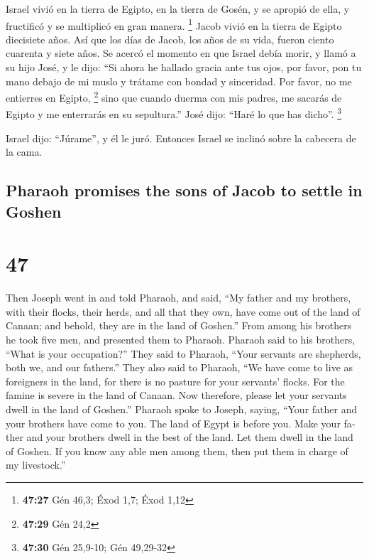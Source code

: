 \begin{paracol}{2}
 Israel vivió en la tierra de Egipto, en la tierra de
Gosén, y se apropió de ella, y fructificó y se multiplicó en gran
manera. \footnote{\textbf{47:27} Gén 46,3; Éxod 1,7; Éxod 1,12}
 Jacob vivió en la tierra de Egipto diecisiete años. Así
que los días de Jacob, los años de su vida, fueron ciento cuarenta y
siete años.  Se acercó el momento en que Israel debía
morir, y llamó a su hijo José, y le dijo: ``Si ahora he hallado gracia
ante tus ojos, por favor, pon tu mano debajo de mi muslo y trátame con
bondad y sinceridad. Por favor, no me entierres en Egipto, \footnote{\textbf{47:29}
  Gén 24,2}  sino que cuando duerma con mis padres, me
sacarás de Egipto y me enterrarás en su sepultura.'' José dijo: ``Haré
lo que has dicho''. \footnote{\textbf{47:30} Gén 25,9-10; Gén 49,29-32}

 Israel dijo: ``Júrame'', y él le juró. Entonces Israel
se inclinó sobre la cabecera de la cama.

\switchcolumn
\begin{otherlanguage}{english}

\hypertarget{pharaoh-promises-the-sons-of-jacob-to-settle-in-goshen}{%
\subsection{Pharaoh promises the sons of Jacob to settle in
Goshen}\label{pharaoh-promises-the-sons-of-jacob-to-settle-in-goshen}}

\hypertarget{section-93}{%
\section{47}\label{section-93}}

 Then Joseph went in and told Pharaoh, and said, ``My
father and my brothers, with their flocks, their herds, and all that
they own, have come out of the land of Canaan; and behold, they are in
the land of Goshen.''  From among his brothers he took
five men, and presented them to Pharaoh.  Pharaoh said to
his brothers, ``What is your occupation?'' They said to Pharaoh, ``Your
servants are shepherds, both we, and our fathers.''  They
also said to Pharaoh, ``We have come to live as foreigners in the land,
for there is no pasture for your servants' flocks. For the famine is
severe in the land of Canaan. Now therefore, please let your servants
dwell in the land of Goshen.''  Pharaoh spoke to Joseph,
saying, ``Your father and your brothers have come to you. 
The land of Egypt is before you. Make your father and your brothers
dwell in the best of the land. Let them dwell in the land of Goshen. If
you know any able men among them, then put them in charge of my
livestock.''


\end{otherlanguage}
\end{paracol}
